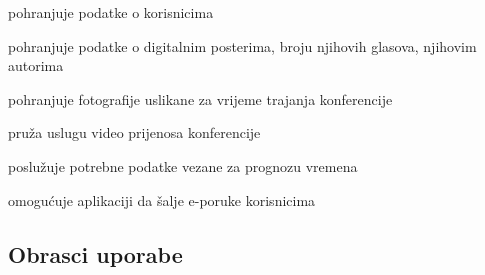 \begin{packed_enum}
\begin{packed_enum}
				\end{packed_enum}
				
				\item {}
				
				\begin{packed_enum}
					
					\item pohranjuje podatke o korisnicima
					\item pohranjuje podatke o digitalnim posterima, broju njihovih glasova, njihovim autorima
					\item pohranjuje fotografije uslikane za vrijeme trajanja konferencije
					
				\end{packed_enum}
				
				\item {}
				
				\begin{packed_enum}
					
					\item pruža uslugu video prijenosa konferencije
				
				\end{packed_enum}
				
				\item {}
				
				\begin{packed_enum}
					
					\item poslužuje potrebne podatke vezane za prognozu vremena
					
				\end{packed_enum}
				
				\item {}
				
				\begin{packed_enum}
					
					\item omogućuje aplikaciji da šalje e-poruke korisnicima
					
				\end{packed_enum}
				
			\end{packed_enum}
			
			\eject 
			
			
				
			\subsection{Obrasci uporabe}
				
